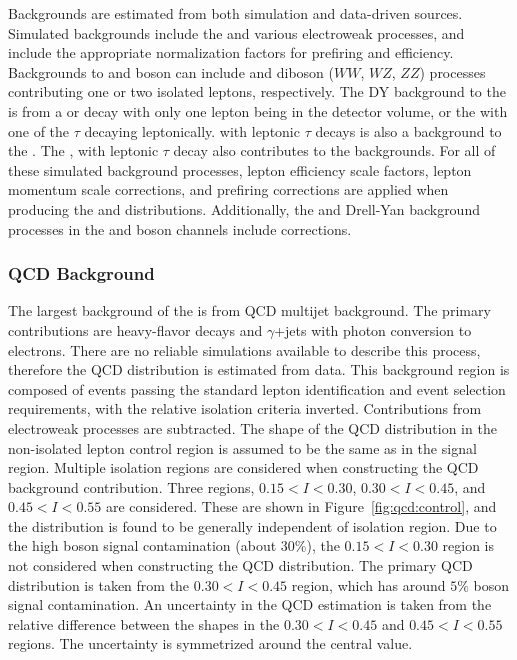 Backgrounds are estimated from both simulation and data-driven sources. Simulated backgrounds include the \ttbar and various electroweak processes, and include the appropriate normalization factors for prefiring and efficiency. Backgrounds to \W and \Z boson can include \ttbar and diboson ($WW$, $WZ$, $ZZ$) processes contributing one or two isolated leptons, respectively. The DY background to the \W is from a \zmm or \zee decay with only one lepton being in the detector volume, or the \ztt with one of the $\tau$ decaying leptonically. \ztt with leptonic $\tau$ decays is also a background to the \Z. The \wtau, with leptonic $\tau$ decay also contributes to the \W backgrounds.
For all of these simulated background processes, lepton efficiency scale factors, lepton momentum scale corrections, and prefiring corrections are applied when producing the \mt and \mll distributions. Additionally, the \wtau and Drell-Yan background processes in the \Wp and \Wm boson channels include \met corrections.


 
\subsubsection{QCD Background}\label{ch:w:qcd}
The largest background of the \W is from QCD multijet background. The primary contributions are heavy-flavor decays and $\gamma$+jets with photon conversion to electrons. There are no reliable simulations available to describe this process, therefore the QCD  \mt distribution is estimated from data. This background region is composed of events passing the standard lepton identification and event selection requirements, with the relative isolation criteria inverted. Contributions from electroweak processes are subtracted. The shape of the QCD \mt distribution in the non-isolated lepton control region is assumed to be the same as in the signal region. Multiple isolation regions are considered when constructing the QCD background contribution. Three regions, $0.15 < I < 0.30$, $0.30 < I < 0.45$, and $0.45 < I < 0.55$ are considered. These are shown in Figure~\ref{fig:qcd:control}, and the \mt distribution is found to be generally independent of isolation region. Due to the high \W boson signal contamination (about $30\%$), the $0.15 < I < 0.30$ region is not considered when constructing the QCD \mt distribution. The primary QCD \mt distribution is taken from the $0.30 < I < 0.45$ region, which has around $5\%$ \W boson signal contamination. An uncertainty in the QCD estimation is taken from the relative difference between the \mt shapes in the $0.30 < I < 0.45$ and $0.45 < I < 0.55$ regions. The uncertainty is symmetrized around the central value.


